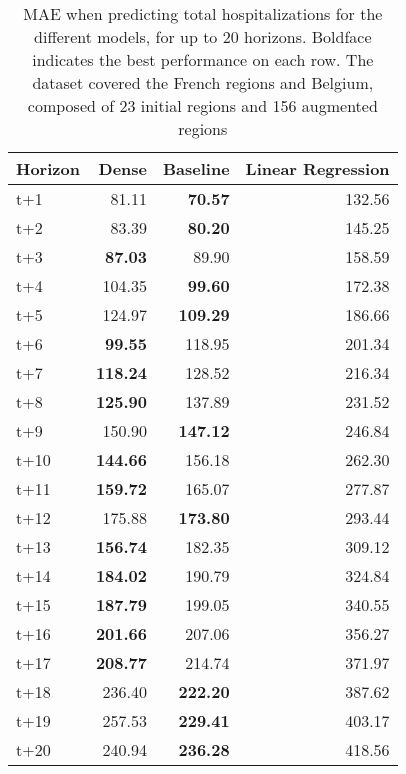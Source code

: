 \begin{table}[H]
\centering
\caption{MAE when predicting total hospitalizations for the different models, for up to 20 horizons. Boldface indicates the best performance on each row. The dataset covered the French regions and Belgium, composed of 23 initial regions and 156 augmented regions }
\label{tab:MAE_comparison}
\begin{tabular}{lrrr}
\toprule
Horizon &  Dense &  Baseline &  Linear Regression \\
\midrule
t+1  & 81.11  & \textbf{70.57}  & 132.56  \\
t+2  & 83.39  & \textbf{80.20}  & 145.25  \\
t+3  & \textbf{87.03}  & 89.90  & 158.59  \\
t+4  & 104.35  & \textbf{99.60}  & 172.38  \\
t+5  & 124.97  & \textbf{109.29}  & 186.66  \\
t+6  & \textbf{99.55}  & 118.95  & 201.34  \\
t+7  & \textbf{118.24}  & 128.52  & 216.34  \\
t+8  & \textbf{125.90}  & 137.89  & 231.52  \\
t+9  & 150.90  & \textbf{147.12}  & 246.84  \\
t+10  & \textbf{144.66}  & 156.18  & 262.30  \\
t+11  & \textbf{159.72}  & 165.07  & 277.87  \\
t+12  & 175.88  & \textbf{173.80}  & 293.44  \\
t+13  & \textbf{156.74}  & 182.35  & 309.12  \\
t+14  & \textbf{184.02}  & 190.79  & 324.84  \\
t+15  & \textbf{187.79}  & 199.05  & 340.55  \\
t+16  & \textbf{201.66}  & 207.06  & 356.27  \\
t+17  & \textbf{208.77}  & 214.74  & 371.97  \\
t+18  & 236.40  & \textbf{222.20}  & 387.62  \\
t+19  & 257.53  & \textbf{229.41}  & 403.17  \\
t+20  & 240.94  & \textbf{236.28}  & 418.56  \\

\bottomrule
\end{tabular}
\end{table}
